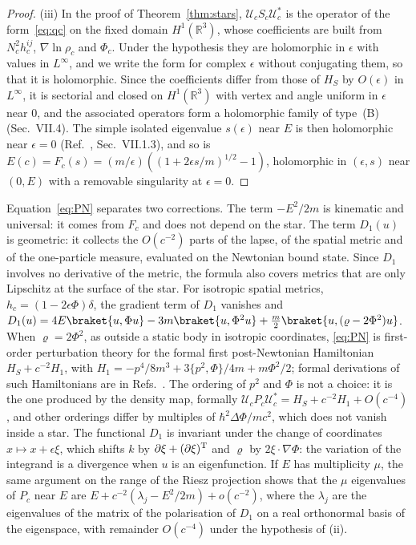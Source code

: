 \documentclass[%
 aip,
 jmp,
 amsmath,amssymb,
 reprint, onecolumn
]{revtex4-1}
\theoremstyle{definition}
\theoremstyle{remark}
\newcommand{\R}{\mathbb{R}}
\begin{document}
\begin{proof}
(iii) In the proof of Theorem~\ref{thm:stars}, $\mathcal{U}_cS_c
\mathcal{U}_c^*$ is the operator of the form~\eqref{eq:qc} on the fixed
domain $H^1(\R^3)$, whose coefficients are built from $N_c^2h_c^{ij}$,
$\nabla\ln\rho_c$ and $\Phi_c$. Under the hypothesis they are holomorphic
in $\epsilon$ with values in $L^\infty$, and we write the form for complex
$\epsilon$ without conjugating them, so that it is holomorphic. Since
the coefficients differ from those of $H_S$ by $O(\epsilon)$ in
$L^\infty$, it is sectorial and closed on $H^1(\R^3)$ with vertex and
angle uniform in $\epsilon$ near $0$, and the associated operators form a
holomorphic family of type~(B)~\cite{Kato1995} (Sec.~VII.4). The simple
isolated eigenvalue $s(\epsilon)$ near $E$ is then holomorphic near
$\epsilon=0$ (Ref.~, Sec.~VII.1.3), and so is
$E(c)=F_c(s)=(m/\epsilon)((1+2\epsilon s/m)^{1/2}-1)$, holomorphic in
$(\epsilon,s)$ near $(0,E)$ with a removable singularity at
$\epsilon=0$.
\end{proof}

Equation~\eqref{eq:PN} separates two corrections. The term $-E^2/2m$ is
kinematic and universal: it comes from $F_c$ and does not depend on the
star. The term $D_1(u)$ is geometric: it collects the $O(c^{-2})$ parts
of the lapse, of the spatial metric and of the one-particle measure,
evaluated on the Newtonian bound state. Since $D_1$ involves no
derivative of the metric, the formula also covers metrics that are only
Lipschitz at the surface of the star. For isotropic spatial metrics,
$h_c=(1-2\epsilon\Phi)\delta$, the gradient term of $D_1$ vanishes and
$D_1(u)=4E\braket{u,\Phi u}-3m\braket{u,\Phi^2u}+\frac m2\braket{u,
(\varrho-2\Phi^2)u}$. When $\varrho=2\Phi^2$, as outside a static body in
isotropic coordinates, \eqref{eq:PN} is first-order perturbation theory
for the formal first post-Newtonian Hamiltonian $H_S+c^{-2}H_1$, with
$H_1=-p^4/8m^3+3\{p^2,\Phi\}/4m+m\Phi^2/2$; formal derivations of such
Hamiltonians are in Refs.~.
The ordering of $p^2$ and $\Phi$ is not a choice: it is the one produced
by the density map, formally $\mathcal{U}_cP_c\mathcal{U}_c^*=H_S+c^{-2}H_1
+O(c^{-4})$, and other orderings differ by multiples of
$\hbar^2\Delta\Phi/mc^2$, which does not vanish inside a star. The
functional $D_1$ is invariant under the change of coordinates
$x\mapsto x+\epsilon\xi$, which shifts $k$ by $\partial\xi+
(\partial\xi)^{\rm T}$ and $\varrho$ by $2\xi\cdot\nabla\Phi$: the
variation of the integrand is a divergence when $u$ is an eigenfunction.
If $E$ has multiplicity $\mu$, the same argument on the range of the
Riesz projection shows that the $\mu$ eigenvalues of $P_c$ near $E$ are
$E+c^{-2}(\lambda_j-E^2/2m)+o(c^{-2})$, where the $\lambda_j$ are the
eigenvalues of the matrix of the polarisation of $D_1$ on a real
orthonormal basis of the eigenspace, with remainder $O(c^{-4})$ under
the hypothesis of (ii).
\end{document}
